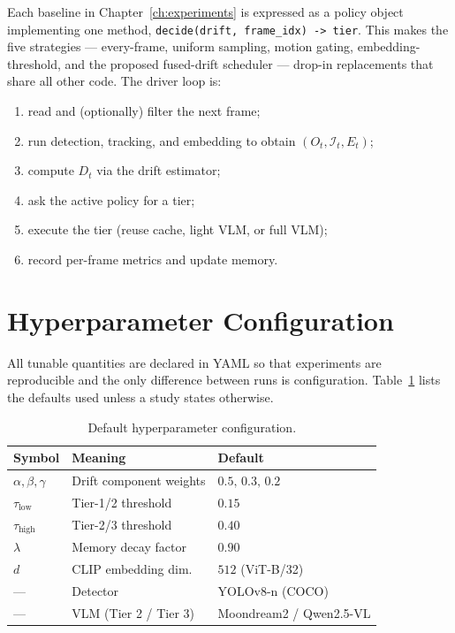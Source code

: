 Each baseline in Chapter~\ref{ch:experiments} is expressed as a policy object
implementing one method, \texttt{decide(drift, frame\_idx) -> tier}. This
makes the five strategies --- every-frame, uniform sampling, motion gating,
embedding-threshold, and the proposed fused-drift scheduler --- drop-in
replacements that share all other code. The driver loop is:

\begin{enumerate}
  \item read and (optionally) filter the next frame;
  \item run detection, tracking, and embedding to obtain $(O_t,\mathcal{I}_t,E_t)$;
  \item compute $D_t$ via the drift estimator;
  \item ask the active policy for a tier;
  \item execute the tier (reuse cache, light VLM, or full VLM);
  \item record per-frame metrics and update memory.
\end{enumerate}

\section{Hyperparameter Configuration}
\label{sec:arch-hyperparams}

All tunable quantities are declared in YAML so that experiments are
reproducible and the only difference between runs is configuration.
Table~\ref{tab:hyperparams} lists the defaults used unless a study states
otherwise.

\begin{table}[htbp]
\centering
\caption[Default hyperparameters]{Default hyperparameter configuration.}
\label{tab:hyperparams}
\small
\begin{tabular}{@{}lll@{}}
\toprule
\textbf{Symbol} & \textbf{Meaning} & \textbf{Default} \\
\midrule
$\alpha,\beta,\gamma$ & Drift component weights & $0.5,\,0.3,\,0.2$ \\
$\tau_{\text{low}}$   & Tier-1/2 threshold      & $0.15$ \\
$\tau_{\text{high}}$  & Tier-2/3 threshold      & $0.40$ \\
$\lambda$             & Memory decay factor     & $0.90$ \\
$d$                   & CLIP embedding dim.\    & $512$ (ViT-B/32) \\
---                   & Detector                & YOLOv8-n (COCO) \\
---                   & VLM (Tier 2 / Tier 3)   & Moondream2 / Qwen2.5-VL \\
\bottomrule
\end{tabular}
\end{table}

